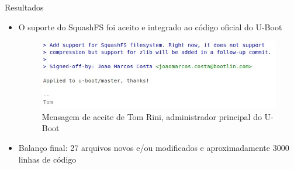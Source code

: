 \begin{frame}{Resultados}
\begin{itemize}
\item O suporte do SquashFS foi aceito e integrado ao código oficial do U-Boot
\begin{figure}
\centering
\includegraphics[scale=0.4]{figuras/tom.jpeg}
\caption{Mensagem de aceite de Tom Rini, administrador principal do U-Boot}
\end{figure}
\item Balanço final: 27 arquivos novos e/ou modificados e aproximadamente 3000 linhas de código
\end{itemize}
\end{frame}

